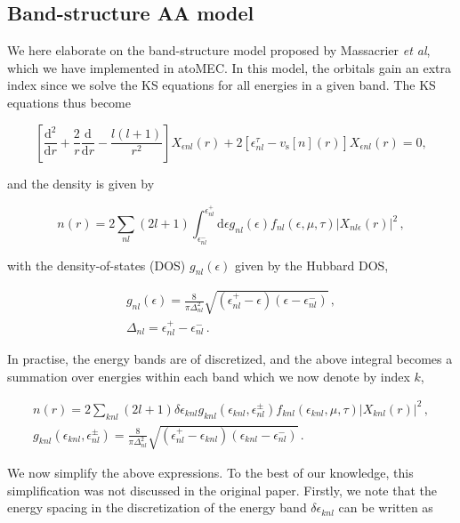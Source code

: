 \documentclass[11pt]{article}
\begin{document}
\hypertarget{band-structure-aa-model}{%
\subsection{Band-structure AA model}\label{band-structure-aa-model}}

We here elaborate on the band-structure model proposed by Massacrier
\emph{et al}, which we have implemented in atoMEC. In this model, the
orbitals gain an extra index since we solve the KS equations for all
energies in a given band. The KS equations thus become

\begin{equation}
\left[\frac{\textrm{d}^2}{\textrm{d}r} + \frac{2}{r}\frac{\textrm{d}}{\textrm{d}r} - \frac{l(l+1)}{r^2} \right] X_{\epsilon nl}(r) + 2 \left[\epsilon^{\tau}_{nl} - v_\textrm{s}[n](r) \right] X_{\epsilon nl}(r) = 0,
\end{equation}

and the density is given by

\begin{equation}
    n(r) = 2\sum_{nl}(2l+1)
    \int_{\epsilon_{nl}^-}^{\epsilon_{nl}^+} \textrm{d}{\epsilon} g_{nl}(\epsilon) f_{nl}(\epsilon,\mu,\tau) |X_{nl\epsilon}(r)|^2\,,
\end{equation}

with the density-of-states (DOS) \(g_{nl}(\epsilon)\) given by the
Hubbard DOS,

\begin{gather}
g_{nl}(\epsilon) =\frac{8}{ \pi \Delta_{nl}^2} \sqrt{(\epsilon^+_{nl}-\epsilon)(\epsilon - \epsilon^-_{nl})}\,,\\
\Delta_{nl} = \epsilon^+_{nl}-\epsilon_{nl}^- \,.
\end{gather}

In practise, the energy bands are of discretized, and the above integral
becomes a summation over energies within each band which we now denote
by index \(k\),

\begin{gather}
 n(r) = 2\sum_{knl}(2l+1) \delta\epsilon_{knl} g_{knl}(\epsilon_{knl},\epsilon_{nl}^\pm) f_{knl}(\epsilon_{knl},\mu,\tau) |X_{knl}(r)|^2\,,\\
 g_{knl}(\epsilon_{knl},\epsilon_{nl}^\pm) =\frac{8}{ \pi \Delta_{nl}^2} \sqrt{(\epsilon^+_{nl}-\epsilon_{knl})(\epsilon_{knl} - \epsilon^-_{nl})}\,.
\end{gather}

We now simplify the above expressions. To the best of our knowledge,
this simplification was not discussed in the original paper. Firstly, we
note that the energy spacing in the discretization of the energy band
\(\delta\epsilon_{knl}\) can be written as
\end{document}
